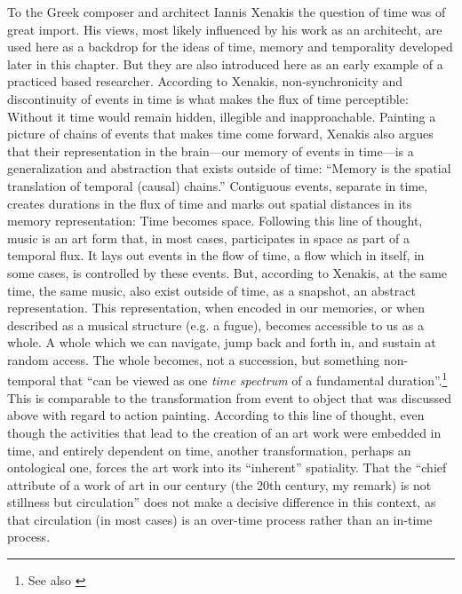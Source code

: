 To the Greek composer and architect Iannis Xenakis the question of time was of great import. His views, most likely influenced by his work as an architecht, are used here as a backdrop for the ideas of time, memory and temporality developed later in this chapter. But they are also introduced here as an early example of a practiced based researcher. According to Xenakis, non-synchronicity and discontinuity of events in time is what makes the flux of time perceptible: Without it time would remain hidden, illegible and inapproachable. Painting a picture of chains of events that makes time come forward, Xenakis also argues that their representation in the brain---our memory of events in time---is a generalization and abstraction that exists outside of time: ``Memory is the spatial translation of temporal (causal) chains.'' \parencite[263]{xenakis71} 
Contiguous events, separate in time, creates durations in the flux of time and marks out spatial distances in its memory representation: Time becomes space. Following this line of thought, music is an art form that, in most cases, participates in space as part of a temporal flux. It lays out events in the flow of time, a flow which in itself, in some cases, is controlled by these events. But, according to Xenakis, at the same time, the same music, also exist outside of time, as a snapshot, an abstract representation.
This representation, when encoded in our memories, or when described as a musical structure (e.g. a fugue), becomes accessible to us as a whole. A whole which we can navigate, jump back and forth in, and sustain at random access. The whole becomes, not a succession, but something non-temporal that ``can be viewed as one \emph{time spectrum} of a fundamental duration''.\footnote{\cite[73, my italics.]{roads} See also \cite{stockhausen57}}
This is comparable to the transformation from event to object that was discussed above with regard to action painting. According to this line of thought, even though the activities that lead to the creation of an art work were embedded in time, and entirely dependent on time, another transformation, perhaps an ontological one, forces the art work into its ``inherent'' spatiality. That the ``chief attribute of a work of art in our century (the 20th century, my remark) is not stillness but circulation'' \parencite[93][]{rosenberg66} does not make a decisive difference in this context, as that circulation (in most cases) is an over-time process rather than an in-time process.

